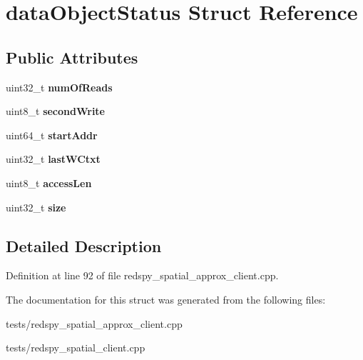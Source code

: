 \hypertarget{structdataObjectStatus}{\section{data\-Object\-Status Struct Reference}
\label{structdataObjectStatus}
}
\subsection*{Public Attributes}
\begin{DoxyCompactItemize}
\item 
\hypertarget{structdataObjectStatus_ab1866057978cdbee6609696075d42103}{uint32\-\_\-t {\bfseries num\-Of\-Reads}}\label{structdataObjectStatus_ab1866057978cdbee6609696075d42103}

\item 
\hypertarget{structdataObjectStatus_a935ab6087be008d4b708de871bf28523}{uint8\-\_\-t {\bfseries second\-Write}}\label{structdataObjectStatus_a935ab6087be008d4b708de871bf28523}

\item 
\hypertarget{structdataObjectStatus_ac096eb153ac2a060b4a584e7685c1b46}{uint64\-\_\-t {\bfseries start\-Addr}}\label{structdataObjectStatus_ac096eb153ac2a060b4a584e7685c1b46}

\item 
\hypertarget{structdataObjectStatus_a931b75da9c08fc9f46ef7f53536b526e}{uint32\-\_\-t {\bfseries last\-W\-Ctxt}}\label{structdataObjectStatus_a931b75da9c08fc9f46ef7f53536b526e}

\item 
\hypertarget{structdataObjectStatus_a8f9b2fdc5d515829a99d3b085473b822}{uint8\-\_\-t {\bfseries access\-Len}}\label{structdataObjectStatus_a8f9b2fdc5d515829a99d3b085473b822}

\item 
\hypertarget{structdataObjectStatus_a7640641de71ed1e62676d8d6cac88cea}{uint32\-\_\-t {\bfseries size}}\label{structdataObjectStatus_a7640641de71ed1e62676d8d6cac88cea}

\end{DoxyCompactItemize}


\subsection{Detailed Description}


Definition at line 92 of file redspy\-\_\-spatial\-\_\-approx\-\_\-client.\-cpp.



The documentation for this struct was generated from the following files\-:\begin{DoxyCompactItemize}
\item 
tests/redspy\-\_\-spatial\-\_\-approx\-\_\-client.\-cpp\item 
tests/redspy\-\_\-spatial\-\_\-client.\-cpp\end{DoxyCompactItemize}
